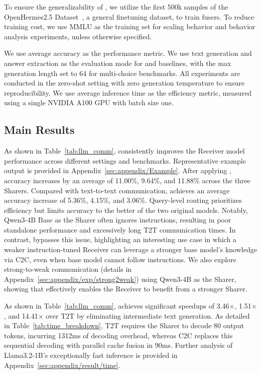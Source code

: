 To ensure the generalizability of \name, we utilize the first 500k samples of the OpenHermes2.5 Dataset~\citep{OpenHermes2.5}, a general finetuning dataset, to train \name fusers. 
To reduce training cost, we use MMLU as the training set for scaling behavior and behavior analysis experiments, unless otherwise specified. 

We use average accuracy as the performance metric. We use text generation and answer extraction as the evaluation mode for \name and baselines, with the max generation length set to 64 for multi-choice benchmarks. All experiments are conducted in the zero-shot setting with zero generation temperature to ensure reproducibility. 
We use average inference time as the efficiency metric, measured using a single NVIDIA A100 GPU with batch size one.

\subsection{Main Results}

As shown in Table~\ref{tab:llm_comm}, \name consistently improves the Receiver model performance across different settings and benchmarks. Representative example output is provided in Appendix~\ref{sec:appendix/Example}.
After applying \name, accuracy increases by an average of 11.00\%, 9.64\%, and 11.88\% across the three Sharers.
Compared with text-to-text communication, \name achieves an average accuracy increase of 5.36\%, 4.15\%, and 3.06\%. 
Query-level routing prioritizes efficiency but limits accuracy to the better of the two original models.
Notably, Qwen3-4B Base as the Sharer often ignores instructions, resulting in poor standalone performance and excessively long T2T communication times.
In contrast, \name bypasses this issue, highlighting an interesting use case in which a weaker instruction-tuned Receiver can leverage a stronger base model's knowledge via C2C, even when base model cannot follow instructions. We also explore strong-to-weak communication (details in Appendix~\ref{sec:appendix/exp/strong2weak}) using Qwen3-4B as the Sharer, showing that \name effectively enables the Receiver to benefit from a stronger Sharer.

As shown in Table~\ref{tab:llm_comm}, \name achieves significant speedups of 3.46$\times$, 1.51$\times$, and 14.41$\times$ over T2T by eliminating intermediate text generation.
As detailed in Table~\ref{tab:time_breakdown}, T2T requires the Sharer to decode 80 output tokens, incurring 1312ms of decoding overhead, whereas C2C replaces this sequential decoding with parallel cache fusion in 90ms.
Further analysis of Llama3.2-1B's exceptionally fast inference is provided in Appendix~\ref{sec:appendix/result/time}.


